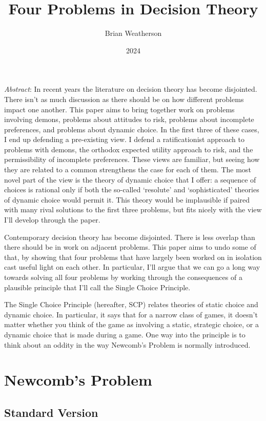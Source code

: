 \documentclass[
  11pt,
  letterpaper,
  DIV=11,
  numbers=noendperiod,
  twoside]{scrartcl}
\title{Four Problems in Decision Theory}
\author{Brian Weatherson}
\date{2024}
\renewenvironment{abstract}
 {\vspace{-1.25cm}
 \quotation\small\noindent\emph{Abstract}:}
 {\endquotation}
\begin{document}
\maketitle
\begin{abstract}
In recent years the literature on decision theory has become disjointed.
There isn't as much discussion as there should be on how different
problems impact one another. This paper aims to bring together work on
problems involving demons, problems about attitudes to risk, problems
about incomplete preferences, and problems about dynamic choice. In the
first three of these cases, I end up defending a pre-existing view. I
defend a ratificationist approach to problems with demons, the orthodox
expected utility approach to risk, and the permissibility of incomplete
preferences. These views are familiar, but seeing how they are related
to a common strengthens the case for each of them. The most novel part
of the view is the theory of dynamic choice that I offer: a sequence of
choices is rational only if both the so-called `resolute' and
`sophisticated' theories of dynamic choice would permit it. This theory
would be implausible if paired with many rival solutions to the first
three problems, but fits nicely with the view I'll develop through the
paper.
\end{abstract}


Contemporary decision theory has become disjointed. There is less
overlap than there should be in work on adjacent problems. This paper
aims to undo some of that, by showing that four problems that have
largely been worked on in isolation cast useful light on each other. In
particular, I'll argue that we can go a long way towards solving all
four problems by working through the consequences of a plausible
principle that I'll call the Single Choice Principle.

The Single Choice Principle (hereafter, SCP) relates theories of static
choice and dynamic choice. In particular, it says that for a narrow
class of games, it doesn't matter whether you think of the game as
involving a static, strategic choice, or a dynamic choice that is made
during a game. One way into the principle is to think about an oddity in
the way Newcomb's Problem is normally introduced.

\section{Newcomb's Problem}\label{sec-newcomb}

\subsection{Standard Version}\label{sec-newcomb-standard}
\end{document}
